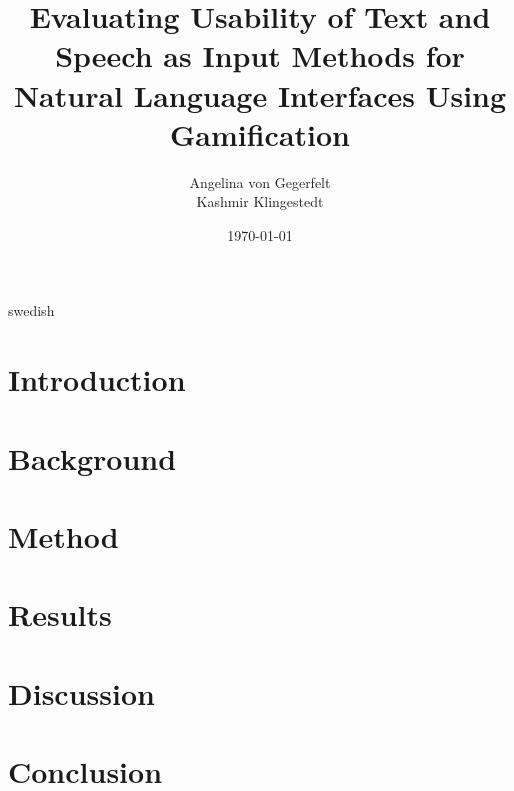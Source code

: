 \documentclass[a4paper,12pt]{kth-mag}
\title{Evaluating Usability of Text and Speech as Input Methods for Natural Language Interfaces Using Gamification}
\author{Angelina von Gegerfelt\\Kashmir Klingestedt}
\date{\today}
\begin{document}
\frontmatter
\pagestyle{empty}
\removepagenumbers
\maketitle
{}

\begin{abstract}
\end{abstract}

\begin{foreignabstract}{swedish}
\end{foreignabstract}
\newpage

\tableofcontents*
\mainmatter
\pagestyle{newchap}

\chapter{Introduction}


\chapter{Background}


\chapter{Method}


\chapter{Results}


\chapter{Discussion}


\chapter{Conclusion}


\newpage


\appendix
\end{document}
